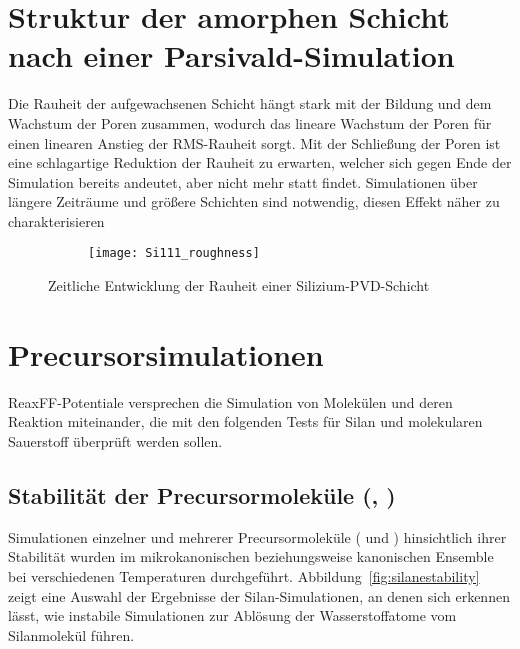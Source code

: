 \section{Struktur der amorphen Schicht nach einer Parsivald-Simulation}

Die Rauheit der aufgewachsenen Schicht hängt stark mit der Bildung und dem Wachstum der Poren zusammen, wodurch das lineare Wachstum der Poren für einen linearen Anstieg der RMS-Rauheit sorgt.
Mit der Schließung der Poren ist eine schlagartige Reduktion der Rauheit zu erwarten, welcher sich gegen Ende der Simulation bereits andeutet, aber nicht mehr statt findet.
Simulationen über längere Zeiträume und größere Schichten sind notwendig, diesen Effekt näher zu charakterisieren

\begin{figure}[ht]
  \centering
  \captionsetup[subfigure]{singlelinecheck=false}
  \def\subfigwidth{0.48\textwidth}
  \begin{subfigure}[t]{\subfigwidth}
    \texttt{[image: Si111\_roughness]}
  \end{subfigure}
  \caption{Zeitliche Entwicklung der Rauheit einer Silizium-PVD-Schicht}
  \label{fig:siliconroughness}
\end{figure}

\section{Precursorsimulationen}

ReaxFF-Potentiale versprechen die Simulation von Molekülen und deren Reaktion miteinander, die mit den folgenden Tests für Silan und molekularen Sauerstoff überprüft werden sollen.

\subsection{Stabilität der Precursormoleküle (, )}

Simulationen einzelner und mehrerer Precursormoleküle ( und ) hinsichtlich ihrer Stabilität wurden im mikrokanonischen beziehungsweise kanonischen Ensemble bei verschiedenen Temperaturen durchgeführt.
Abbildung~\ref{fig:silanestability} zeigt eine Auswahl der Ergebnisse der Silan-Simulationen, an denen sich erkennen lässt, wie instabile Simulationen zur Ablösung der Wasserstoffatome vom Silanmolekül führen.

